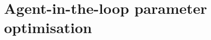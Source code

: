 \documentclass{article}
\def\eg{{\it e.g.}}
\def\R{\mathbb{R}}
\def\vrest{V^{\mathrm{rest}}}
\def\relu{\mathrm{ReLU}}
\begin{document}







\newpage
\section{Agent-in-the-loop parameter optimisation}
\label{app:agent}
\end{document}
